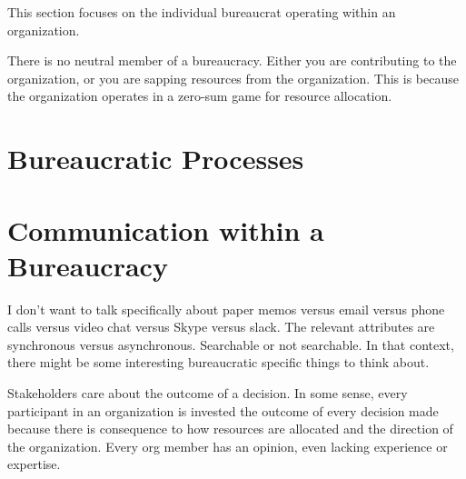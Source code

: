 \documentclass{book}
\begin{document}
    This section focuses on the individual bureaucrat operating within an organization. 
    
    There is no neutral member of a bureaucracy. Either you are contributing to the organization, or you are sapping resources from the organization. This is because the organization operates in a zero-sum game for resource allocation.
    
    
    
    
  \newpage
    
    
    
    
    
  \newpage
  \section{Bureaucratic Processes}
    
    
    
    
    
    
    
    
    
  \newpage
  \section{Communication within a Bureaucracy}
  I don't want to talk specifically about paper memos versus email versus phone calls versus video chat versus Skype versus slack. 
The relevant attributes are synchronous versus asynchronous. Searchable or not searchable. In that context, there might be some interesting bureaucratic specific things to think about.
    
    
    
    
    

    Stakeholders care about the outcome of a decision. 
    In some sense, every participant in an organization is invested the outcome of every decision made because there is consequence to how resources are allocated and the direction of the organization. Every org member has an opinion, even lacking experience or expertise. 
    
\end{document}
